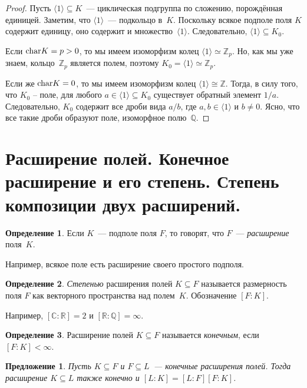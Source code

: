 \documentclass[a4paper, 12pt]{article}
\def\CC{{\mathbb C}}%
\def\ZZ{{\mathbb Z}}%
\def\RR{{\mathbb R}}%
\def\QQ{{\mathbb Q}}%
\def\xar{{\rm char}}%
\newtheorem{proposition}{Предложение}
\theoremstyle{definition}
\newtheorem{definition}{Определение}
\theoremstyle{remark}
\begin{document}
\begin{proof}
Пусть $\langle 1 \rangle \subseteq K$~--- циклическая подгруппа по
сложению, порождённая единицей. Заметим, что $\langle 1 \rangle$~---
подкольцо в~$K$. Поскольку всякое подполе поля $K$ содержит единицу,
оно содержит и множество~$\langle 1 \rangle$. Следовательно,
$\langle 1 \rangle \subseteq K_0$.

Если $\xar K = p > 0$, то мы имеем изоморфизм колец $\langle 1
\rangle \simeq \ZZ_p$. Но, как мы уже знаем,
кольцо~$\ZZ_p$ является полем, поэтому $K_0 = \langle 1 \rangle
\simeq \ZZ_p$.

Если же $\xar K = 0$, то мы имеем изоморфизм колец $\langle 1
\rangle \cong \ZZ$. Тогда, в силу того, что $K_0$ -- поле, для любого $a \in \langle 1
\rangle \subseteq K_0$ существует обратный элемент $1/a$. Следовательно, $K_0$ содержит все дроби вида $a/b$, где
$a,b \in \langle 1 \rangle$ и $b \ne 0$. Ясно, что все такие дроби
образуют поле, изоморфное полю~$\QQ$.
\end{proof}


\section{Расширение полей. Конечное расширение и его степень. Степень композиции двух расширений.}

\begin{definition}
Если $K$~--- подполе поля $F$, то говорят, что $F$~--- {\it
расширение} поля~$K$.
\end{definition}

Например, всякое поле есть расширение своего простого подполя.

\begin{definition}
{\it Степенью} расширения полей $K \subseteq F$ называется
размерность поля $F$ как векторного пространства над полем~$K$.
Обозначение $[F : K]$.
\end{definition}

Например, $[\CC : \RR] = 2$ и $[\RR : \QQ] = \infty$.

\begin{definition}
Расширение полей $K\subseteq F$ называется {\it конечным}, если $[F
: K] < \infty$.
\end{definition}

\begin{proposition}
Пусть $K\subseteq F$ и $F\subseteq L$~--- конечные расширения полей.
Тогда расширение $K\subseteq L$ также конечно и $[L:K]=[L:F][F:K]$.
\end{proposition}
\end{document}
